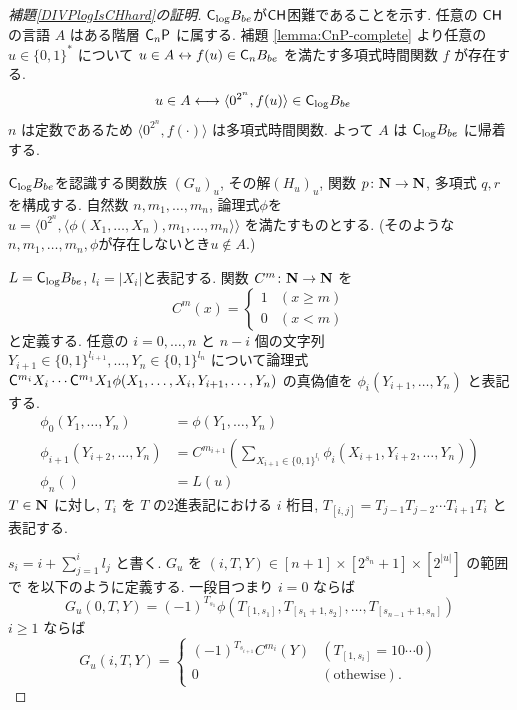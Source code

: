 \begin{proof}[\textup{補題\ref{DIVPlogIsCHhard}の証明}]
 $\mathsf{C}_{\log} B_{be}$が$\mathsf{CH}$困難であることを示す.
 任意の $\mathsf{CH}$ の言語 $A$ はある階層 $\mathsf{C}_n \mathsf{P}$ に属する. 
 補題 \ref{lemma:CnP-complete} より任意の $u \in \{0,1\}^*$ について
 $u \in A \leftrightarrow f(u) \in \mathsf{C}_n B_{be}$ 
 を満たす多項式時間関数 $f$ が存在する.
 \begin{align}
  u \in A 
  & \longleftrightarrow \langle 0^{2^n}, f(u) \rangle \in \mathsf{C}_{\log} B_{be}
 \end{align}
 $n$ は定数であるため $\langle 0^{2^n}, f(\cdot) \rangle$ は多項式時間関数.
 よって $A$ は $\mathsf{C}_{\log} B_{be}$ に帰着する.


 $\mathsf{C}_{\log} B_{be}$を認識する関数族 $(G_u)_u$, 
 その解$(H_u)_u$, 関数 $p \colon \mathbf N \to \mathbf N$, 多項式 $q,r$ を構成する.
 自然数 $n, m_1, \dots, m_n$, 論理式$\phi$を
 $u  = \langle 0^{2^n}, 
 \langle \phi(X_1, \dots, X_n), m_1, \dots, m_n \rangle \rangle$
 を満たすものとする. 
 (そのような$n, m_1, \dots, m_n, \phi$が存在しないとき$u \not \in A$.)
 
 
 $L = \mathsf{C}_{\log} B_{be}$, $l_i = |X_i|$と表記する.
 関数 $C^m \colon \mathbf N \to \mathbf N$ を
 \begin{equation}
  C^m(x) 
     = \begin{cases}
       1 & (x \ge m) \\
       0 & (x < m) \end{cases}
 \end{equation}
 と定義する. 
 任意の $i = 0, \dots, n$ と $n-i$ 個の文字列 
 $Y_{i+1} \in \{0,1\}^{l_{i+1}}, \dots, Y_n \in \{0,1\}^{l_n}$ 
 について論理式
 $\mathsf{C}^{m_{i}}{X_i} \cdots \mathsf{C}^{m_1}{X_1}
 \phi(X_1, \dots, X_i, Y_{i+1}, \dots, Y_n)$
 の真偽値を $\phi_i(Y_{i+1}, \dots, Y_n)$ と表記する.
 \begin{align}
  \phi_0 (Y_1, \dots, Y_n) &= \phi(Y_1, \dots, Y_n)
  \\ \label{eq:phi-step}
  \phi_{i+1}(Y_{i+2}, \dots, Y_n) 
  &= C^{m_{i+1}}\left(\sum\nolimits_{X_{i+1} \in \{0,1\}^{l_i}} 
  \phi_i(X_{i+1}, Y_{i+2}, \dots, Y_{n})\right) 
  \\
  \phi_n() &= L(u) 
 \end{align}
 $T \in \mathbf N$ に対し, $T_i$ を $T$ の2進表記における $i$ 桁目, 
 $T_{[i,j]} = T_{j-1} T_{j-2} \cdots T_{i+1} T_{i}$ と表記する.


 $s_i = i + \sum^i_{j=1}l_j$ と書く.
 $G_u$ を $(i, T, Y) \in [n+1] \times [2^{s_n}+1] \times [2^{|u|}]$ の範囲で
 を以下のように定義する. 一段目つまり $i=0$ ならば
 \begin{equation}
  G_u(0,T,Y) = 
   (-1)^{T_{s_1}}\phi(T_{[1,s_1]}, T_{[s_1+1,s_2]},
    \dots, T_{[s_{n-1}+1,s_n]}) 
 \end{equation}
 $i \ge 1$ ならば
 \begin{equation} \label{eq:def-Gu:case0}
  G_u(i,T,Y) = 
   \begin{cases}
    (-1)^{T_{s_{i+1}}} C^{m_i}(Y) 
    & (T_{[1,s_i]} = 10 \cdots 0) \\
    0 & (\text{othewise}).
   \end{cases} 
 \end{equation}



\end{proof}
